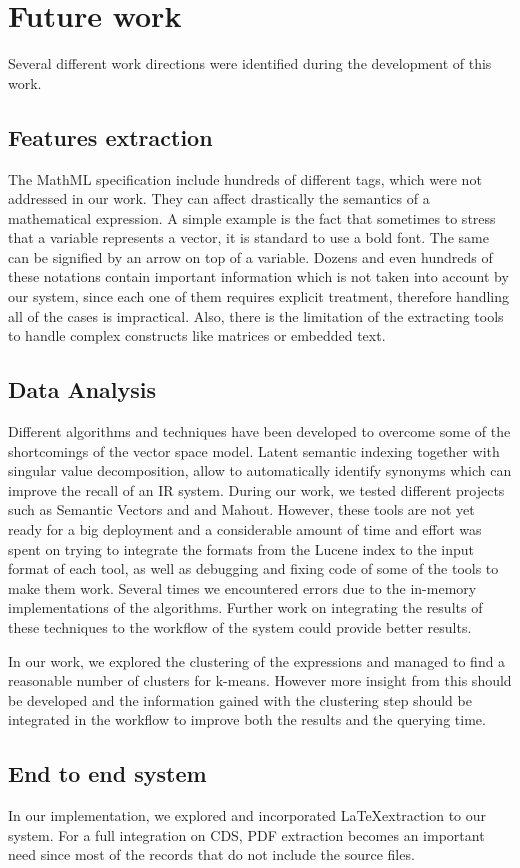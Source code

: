 \chapter{Future work}
\label{chap-future_work}

Several different work directions were identified during the development of this work. 

\section{Features extraction}
The MathML specification include hundreds of different tags, which were not addressed in our work. They can affect drastically the semantics of a mathematical expression. A simple example is the fact that sometimes to stress that a variable represents a vector, it is standard to use a bold font. The same can be signified by an arrow on top of a variable. Dozens and even hundreds of these notations contain important information which is not taken into account by our system, since each one of them requires explicit treatment, therefore handling all of the cases is impractical. Also, there is the limitation of the extracting tools to handle complex constructs like matrices or embedded text.

\section{Data Analysis}
Different algorithms and techniques have been developed to overcome some of the shortcomings of the vector space model. Latent semantic indexing together with singular value decomposition, allow to automatically identify synonyms which can improve the recall of an IR system. During our work, we tested different projects such as Semantic Vectors\cite{semantic_vectors} and \cite{mallet} and Mahout. However, these tools are not yet ready for a big deployment and a considerable amount of time and effort was spent on trying to integrate the formats from the Lucene index to the input format of each tool, as well as debugging and fixing code of some of the tools to make them work. Several times we encountered errors due to the in-memory implementations of the algorithms. Further work on integrating the results of these techniques to the workflow of the system could provide better results. 

In our work, we explored the clustering of the expressions and managed to find a reasonable number of clusters for k-means. However more insight from this should be developed and the information gained with the clustering step should be integrated in the workflow to improve both the results and the querying time. 

\section{End to end system}
In our implementation, we explored and incorporated \LaTeX extraction to our system. For a full integration on CDS, PDF extraction becomes an important need since most of the records that do not include the source files.
